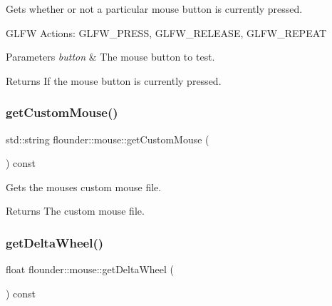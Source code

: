 Gets whether or not a particular mouse button is currently pressed. 

G\+L\+FW Actions\+: G\+L\+F\+W\+\_\+\+P\+R\+E\+SS, G\+L\+F\+W\+\_\+\+R\+E\+L\+E\+A\+SE, G\+L\+F\+W\+\_\+\+R\+E\+P\+E\+AT


\begin{DoxyParams}{Parameters}
{\em button} & The mouse button to test. \\
\hline
\end{DoxyParams}
\begin{DoxyReturn}{Returns}
If the mouse button is currently pressed. 
\end{DoxyReturn}
\mbox{\label{classflounder_1_1mouse_abf32aff720a25f119c6c0a439357122c}} 
\subsubsection{\texorpdfstring{get\+Custom\+Mouse()}{getCustomMouse()}}
{\footnotesize\ttfamily std\+::string flounder\+::mouse\+::get\+Custom\+Mouse (\begin{DoxyParamCaption}{ }\end{DoxyParamCaption}) const\hspace{0.3cm}{\ttfamily [inline]}}



Gets the mouses custom mouse file. 

\begin{DoxyReturn}{Returns}
The custom mouse file. 
\end{DoxyReturn}
\mbox{\label{classflounder_1_1mouse_a0c18d701167fb2a1f0b17e490cfffcd9}} 
\subsubsection{\texorpdfstring{get\+Delta\+Wheel()}{getDeltaWheel()}}
{\footnotesize\ttfamily float flounder\+::mouse\+::get\+Delta\+Wheel (\begin{DoxyParamCaption}{ }\end{DoxyParamCaption}) const\hspace{0.3cm}{\ttfamily [inline]}}



